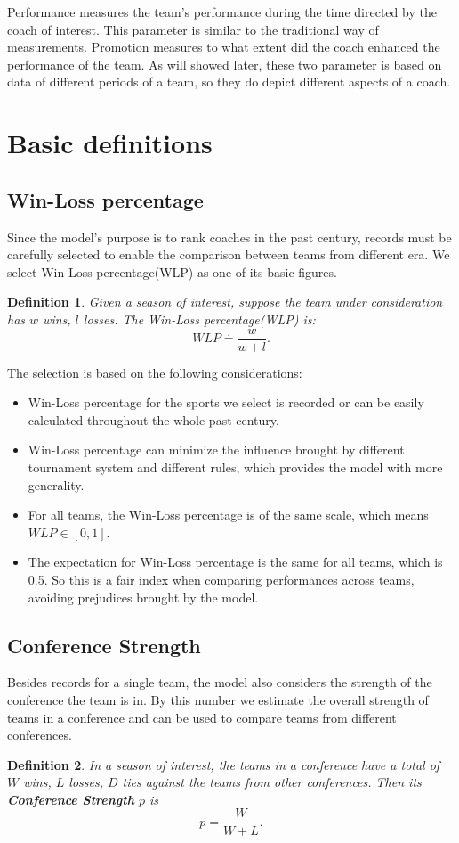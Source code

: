 Performance measures the team's performance during the time directed by the coach of interest. This parameter is similar to the traditional way of measurements. Promotion measures to what extent did the coach enhanced the performance of the team. As will showed later, these two parameter is based on data of different periods of a team, so they do depict different aspects of a coach.

\section{Basic definitions}

\subsection{Win-Loss percentage}
Since the model's purpose is to rank coaches in the past century, records must be carefully selected to enable the comparison between teams from different era. We select Win-Loss percentage(WLP) as one of its basic figures.
\newtheorem{definition}{Definition}
\begin{definition}
Given a season of interest, suppose the team under consideration has $w$ wins, $l$ losses. The Win-Loss percentage(WLP) is:
$$WLP \doteq \frac{w}{w + l}.$$
\end{definition}

The selection is based on the following considerations:

\begin{itemize}
\item Win-Loss percentage for the sports we select is recorded or can be easily calculated throughout the whole past century.
\item Win-Loss percentage can minimize the influence brought by different tournament system and different rules, which provides the model with more generality.
\item For all teams, the Win-Loss percentage is of the same scale, which means $WLP\in [0,1]$.
\item The expectation for Win-Loss percentage is the same for all teams, which is 0.5. So this is a fair index when comparing performances across teams, avoiding prejudices brought by the model.
\end{itemize}

\subsection{Conference Strength}
Besides records for a single team, the model also considers the strength of the conference the team is in. By this number we estimate the overall strength of teams in a conference and can be used to compare teams from different conferences.
\begin{definition}
In a season of interest, the teams in a conference have a total of $W$ wins, $L$ losses, $D$ ties against the teams from other conferences. Then its \textbf{Conference Strength} $p$ is
$$p = \frac{W}{W+L}.$$
\end{definition}

